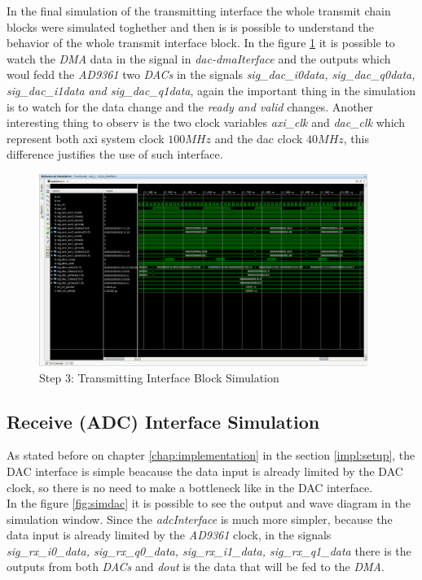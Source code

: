 In the final simulation of the transmitting interface the whole transmit chain
blocks were simulated toghether and then is is possible to understand the
behavior of the whole transmit interface block. In the figure \ref{fig:simtxif}
it is possible to watch the \textit{DMA} data in the signal in
\textit{dac-dmaIterface} and the outputs which woul fedd the \textit{AD9361}
two \textit{DACs} in the signals \textit{sig\_dac\_i0data, sig\_dac\_q0data,
sig\_dac\_i1data and sig\_dac\_q1data}, again the important thing in the simulation
is to watch for the data change and the  \textit{ready and valid} changes.
Another interesting thing to observ is the two clock variables \textit{axi\_clk}
and \textit{dac\_clk} which represent both axi system clock $ 100 MHz$ and the
dac clock $40 MHz$, this difference justifies the use of such interface.


\begin{figure}[htbp]
    \centering
    \includegraphics[width=0.95\textwidth]{./figures/txInterface}
    \caption{ Step 3: Transmitting Interface Block Simulation
    \label{fig:simtxif}}
\end{figure}

\subsection{Receive (ADC) Interface Simulation}

As stated before on chapter \ref{chap:implementation} in the section \ref{impl:setup},
the DAC interface is simple beacause the data input is already limited by the DAC
clock, so there is no need to make a bottleneck like in the DAC interface.\\

 In the figure \ref{fig:simdac} it is possible to see the output and wave
diagram in the simulation window. Since the \textit{adcInterface} is much more
simpler, because the data input is already limited by the \textit{AD9361}
clock, in the signals \textit{sig\_rx\_i0\_data, sig\_rx\_q0\_data,
sig\_rx\_i1\_data, sig\_rx\_q1\_data} there is the outputs from both
\textit{DACs} and \textit{dout} is the data that will be fed to the
\textit{DMA}.\\

